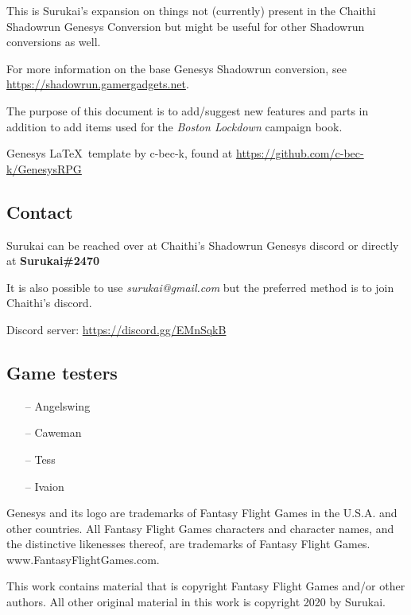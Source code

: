 \documentclass{book}
\begin{document}
\begin{multicols}{2}
This is Surukai's expansion on things not (currently) present in the Chaithi Shadowrun Genesys Conversion but might be useful for other Shadowrun conversions as well.

For more information on the base Genesys Shadowrun conversion, see \url{https://shadowrun.gamergadgets.net}. 

The purpose of this document is to add/suggest new features and parts in addition to add items used for the \textit{Boston Lockdown} campaign book.

Genesys \LaTeX\ template by c-bec-k, found at \url{https://github.com/c-bec-k/GenesysRPG}

\subsection{Contact}
Surukai can be reached over at Chaithi's Shadowrun Genesys discord or directly at \textbf{Surukai\#2470} 

It is also possible to use \textit{surukai@gmail.com} but the preferred method is to join Chaithi's discord. 

Discord server: \url{https://discord.gg/EMnSqkB}

\subsection{Game testers}
\begin{itemize}[noitemsep]
	\item[--] Angelswing
	\item[--] Caweman
	\item[--] Tess
	\item[--] Ivaion
\end{itemize}



\end{multicols}




\vfill

\small Genesys and its logo are trademarks of Fantasy Flight Games in the U.S.A. and other countries. All Fantasy Flight Games characters and character names, and the distinctive likenesses thereof, are trademarks of Fantasy Flight Games. www.FantasyFlightGames.com.

\small This work contains material that is copyright Fantasy Flight Games and/or other authors. All other original material in this work is copyright 2020 by Surukai.
\end{document}
